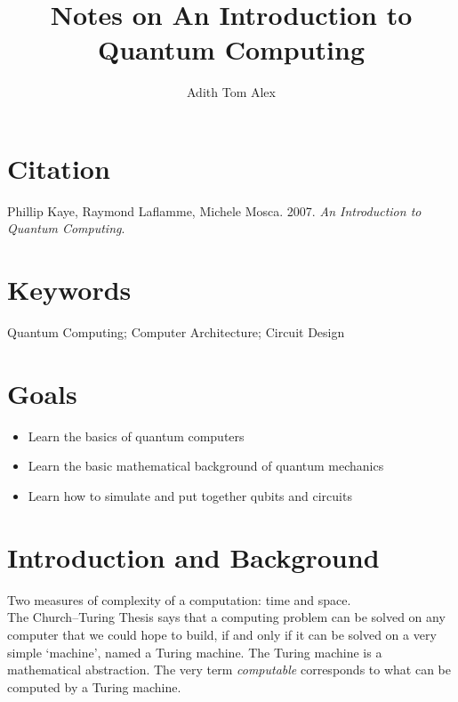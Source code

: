 \documentclass[12pt]{article}
\title{Notes on An Introduction to Quantum Computing}
\author{Adith Tom Alex}
\begin{document}
\maketitle

\section{Citation}
Phillip Kaye, Raymond Laflamme, Michele Mosca. 2007. \textit{An Introduction to Quantum Computing}.

\section{Keywords}
Quantum Computing; Computer Architecture; Circuit Design

\section{Goals}
\begin{itemize}
    \item Learn the basics of quantum computers
    \item Learn the basic mathematical background of quantum mechanics
    \item Learn how to simulate and put together qubits and circuits
\end{itemize}

\clearpage %


\setcounter{section}{0}  %



\section{Introduction and Background}

Two measures of complexity of a computation: time and space.\\

The Church–Turing Thesis says that a computing problem can be solved on any computer that we could hope to build, if and only if it can be solved on a very simple ‘machine’, named a Turing machine. The Turing machine is a mathematical abstraction.
The very term \textit{computable} corresponds to what can be computed by
a Turing machine.
\end{document}

